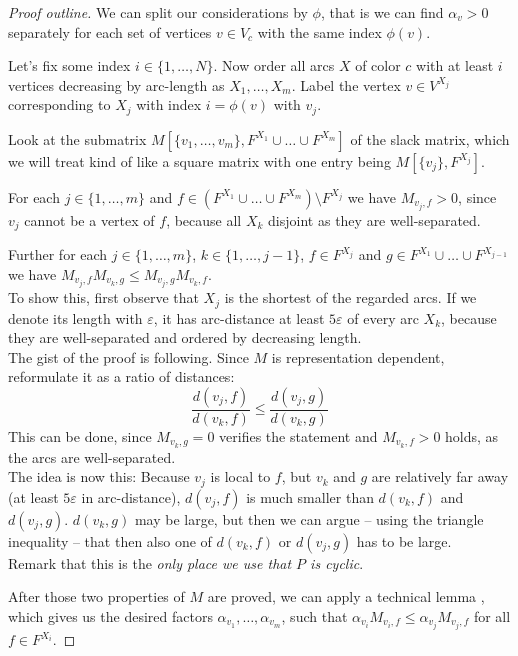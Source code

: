\begin{proof}[Proof outline]
  We can split our considerations by $\phi$, that is we can find $\alpha_v > 0$ separately for each set of vertices $v \in V_c$ with the same index $\phi(v)$.

  Let's fix some index $i \in \{1,\dots,N\}$. Now order all arcs $X$ of color $c$ with at least $i$ vertices decreasing by arc-length as $X_1,\dots,X_m$. Label the vertex $v \in V^{X_j}$ corresponding to $X_j$ with index $i = \phi(v)$ with $v_j$.

  Look at the submatrix $M \left[ \{v_1, \dots, v_m\},F^{X_1} \cup \dots \cup F^{X_m} \right]$ of the slack matrix, which we will treat kind of like a square matrix with one entry being $M \left[ \{v_j\},F^{X_j} \right]$.

  For each $j \in \{1,\dots,m\}$ and $f \in (F^{X_1} \cup \dots \cup F^{X_m}) \setminus F^{X_j}$ we have $M_{v_j, f} > 0$, since $v_j$ cannot be a vertex of $f$, because all $X_k$ disjoint as they are well-separated.

  Further for each $j \in \{1,\dots,m\}$, $k \in \{1,\dots,j-1\}$, $f \in F^{X_j}$ and $g \in F^{X_1} \cup \dots \cup F^{X_{j-1}}$ we have $M_{v_j,f}M_{v_k,g} \leq M_{v_j,g}M_{v_k,f}$. \\
  To show this, first observe that $X_j$ is the shortest of the regarded arcs. If we denote its length with $\varepsilon$, it has arc-distance at least $5\varepsilon$ of every arc $X_k$, because they are well-separated and ordered by decreasing length.\\
  The gist of the proof is following. Since $M$ is representation dependent, reformulate it as a ratio of distances:
  $$\frac{d(v_j,f)}{d(v_k,f)} \leq \frac{d(v_j,g)}{d(v_k,g)}$$
  This can be done, since $M_{v_k,g} = 0$ verifies the statement and $M_{v_k,f} > 0$ holds, as the arcs are well-separated.\\
  The idea is now this: Because $v_j$ is local to $f$, but $v_k$ and $g$ are relatively far away (at least $5\varepsilon$ in arc-distance), $d(v_j,f)$ is much smaller than $d(v_k,f)$ and $d(v_j,g)$. $d(v_k,g)$ may be large, but then we can argue -- using the triangle inequality -- that then also one of $d(v_k,f)$ or $d(v_j,g)$ has to be large.\\
  Remark that this is the \emph{only place we use that $P$ is cyclic}.

  After those two properties of $M$ are proved, we can apply a technical lemma \cite[Lemma 10.3]{kwan2020extension}, which gives us the desired factors $\alpha_{v_1}, \dots, \alpha_{v_m}$, such that $\alpha_{v_i} M_{v_i,f} \leq \alpha_{v_j} M_{v_j,f}$ for all $f \in F^{X_i}$.
\end{proof}

